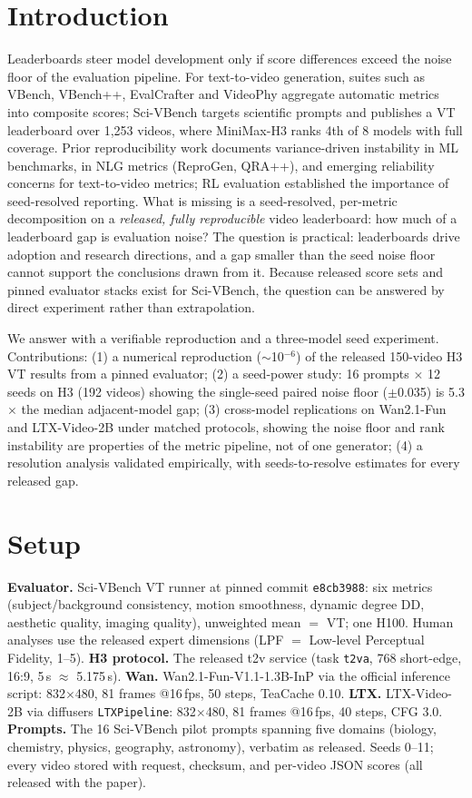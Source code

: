 \documentclass[conference]{IEEEtran}
\begin{document}
\section{Introduction}
Leaderboards steer model development only if score differences exceed the
noise floor of the evaluation pipeline. For text-to-video generation, suites
such as VBench, VBench++, EvalCrafter and VideoPhy aggregate automatic metrics
into composite scores; Sci-VBench targets scientific prompts and publishes a
VT leaderboard over 1{,}253 videos, where MiniMax-H3 ranks 4th of 8 models
with full coverage. Prior reproducibility work documents variance-driven
instability in ML benchmarks, in NLG metrics (ReproGen, QRA++), and emerging
reliability concerns for text-to-video metrics; RL evaluation established the
importance of seed-resolved reporting. What is missing is a seed-resolved,
per-metric decomposition on a \emph{released, fully reproducible} video
leaderboard: how much of a leaderboard gap is evaluation noise? The question
is practical: leaderboards drive adoption and research directions, and a gap
smaller than the seed noise floor cannot support the conclusions drawn from
it. Because released score sets and pinned evaluator stacks exist for
Sci-VBench, the question can be answered by direct experiment rather than
extrapolation.

We answer with a verifiable reproduction and a three-model seed experiment.
Contributions: (1) a numerical reproduction ($\sim$10$^{-6}$) of the released
150-video H3 VT results from a pinned evaluator; (2) a seed-power study: 16
prompts $\times$ 12 seeds on H3 (192 videos) showing the single-seed paired
noise floor ($\pm$0.035) is 5.3$\times$ the median adjacent-model gap;
(3) cross-model replications on Wan2.1-Fun and LTX-Video-2B under matched
protocols, showing the noise floor and rank instability are properties of the
metric pipeline, not of one generator; (4) a resolution analysis validated
empirically, with seeds-to-resolve estimates for every released gap.

\section{Setup}
\textbf{Evaluator.} Sci-VBench VT runner at pinned commit \texttt{e8cb3988}:
six metrics (subject/background consistency, motion smoothness, dynamic
degree DD, aesthetic quality, imaging quality), unweighted mean $=$ VT; one
H100. Human analyses use the released expert dimensions (LPF $=$ Low-level
Perceptual Fidelity, 1--5).
\textbf{H3 protocol.} The released t2v service (task \texttt{t2va}, 768
short-edge, 16:9, 5\,s $\approx$ 5.175\,s).
\textbf{Wan.} Wan2.1-Fun-V1.1-1.3B-InP via the official inference script:
832$\times$480, 81 frames @16\,fps, 50 steps, TeaCache 0.10.
\textbf{LTX.} LTX-Video-2B via diffusers \texttt{LTXPipeline}: 832$\times$480,
81 frames @16\,fps, 40 steps, CFG 3.0.
\textbf{Prompts.} The 16 Sci-VBench pilot prompts spanning five domains
(biology, chemistry, physics, geography, astronomy), verbatim as released.
Seeds 0--11; every video stored with request, checksum, and per-video JSON
scores (all released with the paper).
\end{document}
